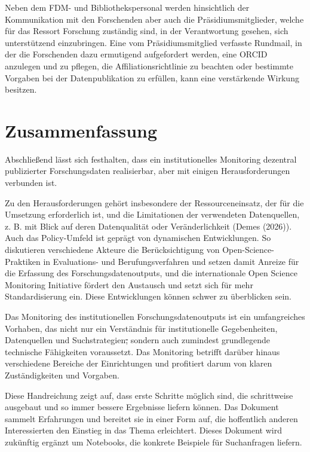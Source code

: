 \documentclass[
  ngerman,
  letterpaper,
  DIV=11]{scrreprt}
\begin{document}
Neben dem FDM- und Bibliothekspersonal werden hinsichtlich der
Kommunikation mit den Forschenden aber auch die Präsidiumsmitglieder,
welche für das Ressort Forschung zuständig sind, in der Verantwortung
gesehen, sich unterstützend einzubringen. Eine vom Präsidiumsmitglied
verfasste Rundmail, in der die Forschenden dazu ermutigend aufgefordert
werden, eine ORCID anzulegen und zu pflegen, die Affiliationsrichtlinie
zu beachten oder bestimmte Vorgaben bei der Datenpublikation zu
erfüllen, kann eine verstärkende Wirkung besitzen.

\chapter{Zusammenfassung}\label{zusammenfassung}

Abschließend lässt sich festhalten, dass ein institutionelles Monitoring
dezentral publizierter Forschungsdaten realisierbar, aber mit einigen
Herausforderungen verbunden ist.

Zu den Herausforderungen gehört insbesondere der Ressourceneinsatz, der
für die Umsetzung erforderlich ist, und die Limitationen der verwendeten
Datenquellen, z. B. mit Blick auf deren Datenqualität oder
Veränderlichkeit (Demes (2026)). Auch das Policy-Umfeld ist geprägt von
dynamischen Entwicklungen. So diskutieren verschiedene Akteure die
Berücksichtigung von Open-Science-Praktiken in Evaluations- und
Berufungsverfahren und setzen damit Anreize für die Erfassung des
Forschungsdatenoutputs, und die internationale Open Science Monitoring
Initiative fördert den Austausch und setzt sich für mehr
Standardisierung ein. Diese Entwicklungen können schwer zu überblicken
sein.

Das Monitoring des institutionellen Forschungsdatenoutputs ist ein
umfangreiches Vorhaben, das nicht nur ein Verständnis für
institutionelle Gegebenheiten, Datenquellen und Suchstrategien\st{,}
sondern auch zumindest grundlegende technische Fähigkeiten voraussetzt.
Das Monitoring betrifft darüber hinaus verschiedene Bereiche der
Einrichtungen und profitiert darum von klaren Zuständigkeiten und
Vorgaben.

Diese Handreichung zeigt auf, dass erste Schritte möglich sind, die
schrittweise ausgebaut und so immer bessere Ergebnisse liefern können.
Das Dokument sammelt Erfahrungen und bereitet sie in einer Form auf, die
hoffentlich anderen Interessierten den Einstieg in das Thema
erleichtert. Dieses Dokument wird zukünftig ergänzt um Notebooks, die
konkrete Beispiele für Suchanfragen liefern.
\end{document}
